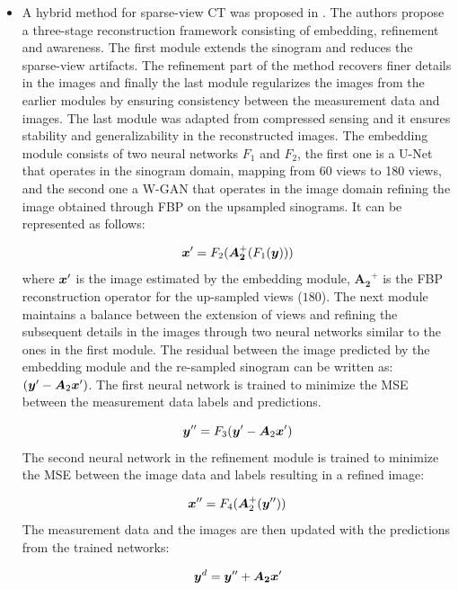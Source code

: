 \begin{itemize}
\item A hybrid method for sparse-view \ac{CT} was proposed in \cite{wu2021drone}. The authors propose a three-stage reconstruction framework consisting of embedding, refinement and awareness. The first module extends the sinogram and reduces the sparse-view artifacts. The refinement part of the method recovers finer details in the images and finally the last module regularizes the images from the earlier modules by ensuring consistency between the measurement data and images. The last module was adapted from compressed sensing and it ensures stability and generalizability in the reconstructed images. The embedding module consists of two neural networks $F_1$ and $F_2$, the first one is a U-Net that operates in the sinogram domain, mapping from 60 views to 180 views, and the second one a W-GAN that operates in the image domain refining the image obtained through \ac{FBP} on the upsampled sinograms. It can be represented as follows:

\begin{equation}
\bm{x}^{\prime}=F_{2}(\bm{A_{2}}^{+}(F_{1} (\bm{y})))
\end{equation}
where $\bm{x}^{\prime}$ is the image estimated by the embedding module, $\bm{A_2}^{+}$ is the \ac{FBP} reconstruction operator for the up-sampled views ($180$). The next module maintains a balance between the extension of views and refining the subsequent details in the images through two neural networks similar to the ones in the first module. The residual between the image predicted by the embedding module and the re-sampled sinogram can be written as: $(\bm{y}'-\bm{A}_{2} \bm{x}')$. The first neural network is trained to minimize the \ac{MSE} between the measurement data labels and predictions.   

\begin{equation}
	\bm{y}'' = F_3(\bm{y}'-\bm{A}_{2} \bm{x}')
\end{equation} 
The second neural network in the refinement module is trained to minimize the \ac{MSE} between the image data and labels resulting in a refined image:

\begin{equation}
\bm{x}'' = F_4(\bm{A}_{2}^{+}(\bm{y}''))
\end{equation} 
The measurement data and the images are then updated with the predictions from the trained networks:

\begin{equation}
	\bm{y}^d = \bm{y}'' + \bm{A_{2}} \bm{x}' 
\end{equation}


\end{itemize}
